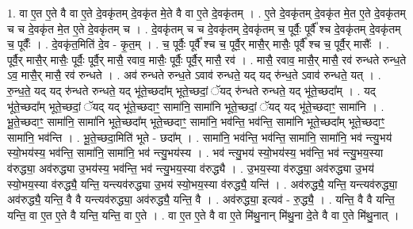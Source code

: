 \documentclass[17pt]{extarticle}
\begin{document}
1. वा ए॒त ए॒ते वै वा ए॒ते दे॒वकृ॑तम् दे॒वकृ॑त मे॒ते वै वा ए॒ते दे॒वकृ॑तम् । . ए॒ते दे॒वकृ॑तम् दे॒वकृ॑त मे॒त ए॒ते दे॒वकृ॑तम् च च दे॒वकृ॑त मे॒त ए॒ते दे॒वकृ॑तम् च । . दे॒वकृ॑तम् च च दे॒वकृ॑तम् दे॒वकृ॑तम् च॒ पूर्वैः॒ पूर्वै᳚ श्च दे॒वकृ॑तम् दे॒वकृ॑तम् च॒ पूर्वैः᳚ । . दे॒वकृ॑त॒मिति॑ दे॒व - कृ॒त॒म् । . च॒ पूर्वैः॒ पूर्वै᳚ श्च च॒ पूर्वै॒र् मासै॒र् मासैः॒ पूर्वै᳚ श्च च॒ पूर्वै॒र् मासैः᳚ । . पूर्वै॒र् मासै॒र् मासैः॒ पूर्वैः॒ पूर्वै॒र् मासै॒ रवाव॒ मासैः॒ पूर्वैः॒ पूर्वै॒र् मासै॒ रव॑ । . मासै॒ रवाव॒ मासै॒र् मासै॒ रव॑ रुन्धते रुन्ध॒ते ऽव॒ मासै॒र् मासै॒ रव॑ रुन्धते । . अव॑ रुन्धते रुन्ध॒ते ऽवाव॑ रुन्धते॒ यद् यद् रु॑न्ध॒ते ऽवाव॑ रुन्धते॒ यत् । . रु॒न्ध॒ते॒ यद् यद् रु॑न्धते रुन्धते॒ यद् भू॑ते॒च्छदा᳚म् भूते॒च्छदां॒ ॅयद् रु॑न्धते रुन्धते॒ यद् भू॑ते॒च्छदा᳚म् । . यद् भू॑ते॒च्छदा᳚म् भूते॒च्छदां॒ ॅयद् यद् भू॑ते॒च्छदाꣳ॒॒ सामा॑नि॒ सामा॑नि भूते॒च्छदां॒ ॅयद् यद् भू॑ते॒च्छदाꣳ॒॒ सामा॑नि । . भू॒ते॒च्छदाꣳ॒॒ सामा॑नि॒ सामा॑नि भूते॒च्छदा᳚म् भूते॒च्छदाꣳ॒॒ सामा॑नि॒ भव॑न्ति॒ भव॑न्ति॒ सामा॑नि भूते॒च्छदा᳚म् भूते॒च्छदाꣳ॒॒ सामा॑नि॒ भव॑न्ति । . भू॒ते॒च्छदा॒मिति॑ भूते - छदा᳚म् । . सामा॑नि॒ भव॑न्ति॒ भव॑न्ति॒ सामा॑नि॒ सामा॑नि॒ भव॑ न्त्यु॒भय॑ स्यो॒भय॑स्य॒ भव॑न्ति॒ सामा॑नि॒ सामा॑नि॒ भव॑ न्त्यु॒भय॑स्य । . भव॑ न्त्यु॒भय॑ स्यो॒भय॑स्य॒ भव॑न्ति॒ भव॑ न्त्यु॒भय॒स्या व॑रुद्ध्या॒ अव॑रुद्ध्या उ॒भय॑स्य॒ भव॑न्ति॒ भव॑ न्त्यु॒भय॒स्या व॑रुद्ध्यै । . उ॒भय॒स्या व॑रुद्ध्या॒ अव॑रुद्ध्या उ॒भय॑ स्यो॒भय॒स्या व॑रुद्ध्यै॒ यन्ति॒ यन्त्यव॑रुद्ध्या उ॒भय॑ 
स्यो॒भय॒स्या व॑रुद्ध्यै॒ यन्ति॑ । . अव॑रुद्ध्यै॒ यन्ति॒ यन्त्यव॑रुद्ध्या॒ अव॑रुद्ध्यै॒ यन्ति॒ वै वै यन्त्यव॑रुद्ध्या॒ अव॑रुद्ध्यै॒ यन्ति॒ वै । . अव॑रुद्ध्या॒ इत्यव॑ - रु॒द्ध्यै॒ । . यन्ति॒ वै वै यन्ति॒ यन्ति॒ वा ए॒त ए॒ते वै यन्ति॒ यन्ति॒ वा ए॒ते । . वा ए॒त ए॒ते वै वा ए॒ते मि॑थु॒नान् मि॑थु॒ना दे॒ते वै वा ए॒ते मि॑थु॒नात् । \newline
\end{document}
